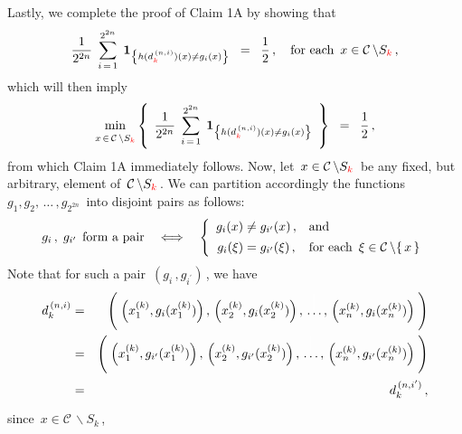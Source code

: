 Lastly, we complete the proof of Claim 1A by showing that
\begin{equation}\label{eqn:ClaimOneA}
\dfrac{1}{2^{2n}}\;\,
\overset{2^{2n}}{\underset{i\,=\,1}{\sum}}\;\,
\mathbf{1}_{\left\{h(d^{\,(n,i)}_{{\color{red}k}})(x) \neq g_{i}(x)\right\}}
\;\; = \;\;
	\dfrac{1}{2}\,,
\quad
\textnormal{for each \,$x \in \mathcal{C}\,\backslash S_{{\color{red}k}}$}\,,
\end{equation}
which will then imply
\begin{equation*}
\underset{x\,\overset{{\color{white}.}}{\in}\,\mathcal{C}\,\backslash S_{{\color{red}k}}}{\min}
\left\{\;\,
	\dfrac{1}{2^{2n}}\;\,
	\overset{2^{2n}}{\underset{i\,=\,1}{\sum}}\;\,
	\mathbf{1}_{\left\{h(d^{\,(n,i)}_{{\color{red}k}})(x) \neq g_{i}(x)\right\}}
	\,\;\right\}
\;\; = \;\;
	\dfrac{1}{2}\,,
\end{equation*}
from which Claim 1A immediately follows.
Now, let \,$x \in \mathcal{C}\,\backslash S_{{\color{red}k}}$\, be any fixed, but arbitrary, element
of \,$\mathcal{C}\,\backslash S_{{\color{red}k}}$\,. We can partition accordingly the functions
\,$g_{1}, g_{2}, \,\ldots\,, g_{2^{2n}}$\, into disjoint pairs as follows:
\begin{equation*}
g_{i}\,,\; g_{i^{\prime}} \,\;\textnormal{form a pair}
\quad\Longleftrightarrow\quad
\left\{\begin{array}{cl}
	g_{i}(x) \neq g_{i^{\prime}}(x)\,, & \textnormal{and}
	\\
	g_{i}(\xi) \overset{{\color{white}\vert}}{=} g_{i^{\prime}}(\xi)\,, & \textnormal{for each \,$\xi \in \mathcal{C}\,\backslash\{\,x\,\}$}
	\end{array}\right.
\end{equation*}
Note that for such a pair \,$(g_{i}\,, g_{i^{\prime}})$\,, we have
\begin{eqnarray*}
d^{\,(n,i)}_{k}
& = &
	\left(\;
		\left(x^{(k)}_{1},g_{i}(x^{(k)}_{1})\right) ,\,
		\left(x^{(k)}_{2},g_{i}(x^{(k)}_{2})\right) ,\,
		\overset{{\color{white}\textnormal{\Large$\vert$}}}{\ldots}\,,\,
		\left(x^{(k)}_{n},g_{i}(x^{(k)}_{n})\right)
	\;\right)
\\
& = &
	\left(\;
		\left(x^{(k)}_{1},g_{i^{\prime}}(x^{(k)}_{1})\right) ,\,
		\left(x^{(k)}_{2},g_{i^{\prime}}(x^{(k)}_{2})\right) ,\,
		\overset{{\color{white}\textnormal{\Large$\vert$}}}{\ldots}\,,\,
		\left(x^{(k)}_{n},g_{i^{\prime}}(x^{(k)}_{n})\right)
	\;\right)
\\
& = &
	d^{\,(n,i^{\prime})}_{k}\,,
\end{eqnarray*}
since \,$x \in \mathcal{C}\,\backslash S_{k}$\,,
